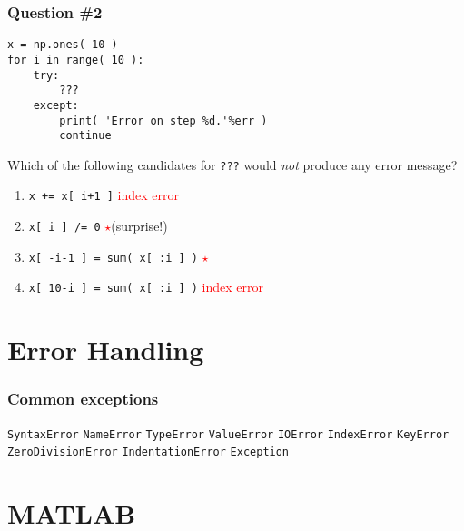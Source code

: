 \documentclass[11pt]{beamer}
\newcommand{\correctstar}{{\Large\textcolor{red}{$\star$}}}
\begin{document}
\begin{frame}[fragile]
  \frametitle{Question \#2}
  \Enlarge

  \begin{Verbatim}
x = np.ones( 10 )
for i in range( 10 ):
    try:
        ???
    except:
        print( 'Error on step %d.'%err )
        continue
  \end{Verbatim}

Which of the following candidates for \texttt{???} would \emph{not} produce any error message?

  \begin{enumerate}[label=\Alph*]
    \item  \texttt{x += x[ i+1 ]}  \textcolor{red}{index error}
    \item  \texttt{x[ i ] /= 0}  \correctstar (surprise!)
    \item  \texttt{x[ -i-1 ]   = sum( x[ :i ] )}  \correctstar
    \item  \texttt{x[ 10-i ] = sum( x[ :i ] )}  \textcolor{red}{index error}
  \end{enumerate}
\end{frame}

\section{Error Handling}

\begin{frame}[fragile]
  \frametitle{Common exceptions}
  \Enlarge

  \begin{enumerate}
  \myitem  \texttt{SyntaxError}
  \myitem  \texttt{NameError}
  \myitem  \texttt{TypeError}
  \myitem  \texttt{ValueError}
  \myitem  \texttt{IOError}
  \myitem  \texttt{IndexError}
  \myitem  \texttt{KeyError}
  \myitem  \texttt{ZeroDivisionError}
  \myitem  \texttt{IndentationError}
  \myitem  \texttt{Exception}
  \end{enumerate}
\end{frame}

\section{MATLAB}
\end{document}
